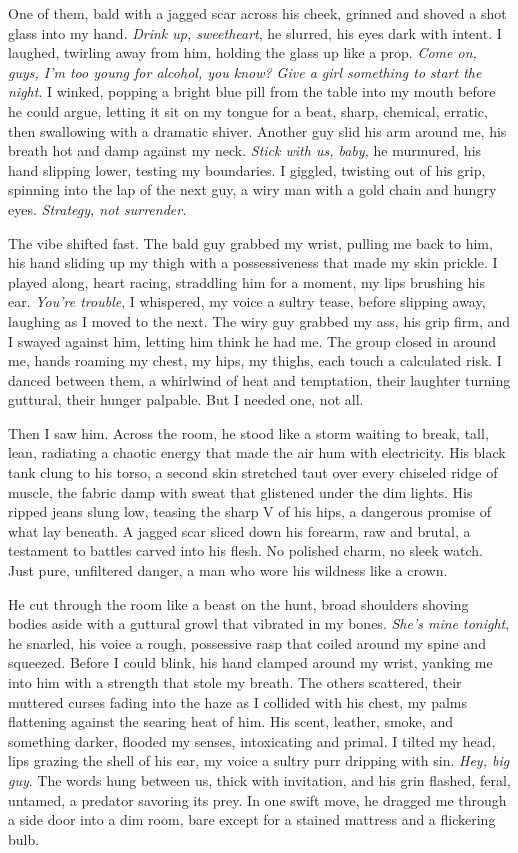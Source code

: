 \documentclass[12pt,oneside]{book} %
\begin{document}
One of them, bald with a jagged scar across his cheek, grinned and shoved a shot glass into my hand. \textit{Drink up, sweetheart}, he slurred, his eyes dark with intent. I laughed, twirling away from him, holding the glass up like a prop. \textit{Come on, guys, I’m too young for alcohol, you know? Give a girl something to start the night}. I winked, popping a bright blue pill from the table into my mouth before he could argue, letting it sit on my tongue for a beat, sharp, chemical, erratic, then swallowing with a dramatic shiver. Another guy slid his arm around me, his breath hot and damp against my neck. \textit{Stick with us, baby,} he murmured, his hand slipping lower, testing my boundaries. I giggled, twisting out of his grip, spinning into the lap of the next guy, a wiry man with a gold chain and hungry eyes. \textit{Strategy, not surrender.}

The vibe shifted fast. The bald guy grabbed my wrist, pulling me back to him, his hand sliding up my thigh with a possessiveness that made my skin prickle. I played along, heart racing, straddling him for a moment, my lips brushing his ear. \textit{You’re trouble}, I whispered, my voice a sultry tease, before slipping away, laughing as I moved to the next. The wiry guy grabbed my ass, his grip firm, and I swayed against him, letting him think he had me. The group closed in around me, hands roaming my chest, my hips, my thighs, each touch a calculated risk. I danced between them, a whirlwind of heat and temptation, their laughter turning guttural, their hunger palpable. But I needed one, not all.

Then I saw him. Across the room, he stood like a storm waiting to break, tall, lean, radiating a chaotic energy that made the air hum with electricity. His black tank clung to his torso, a second skin stretched taut over every chiseled ridge of muscle, the fabric damp with sweat that glistened under the dim lights. His ripped jeans slung low, teasing the sharp V of his hips, a dangerous promise of what lay beneath. A jagged scar sliced down his forearm, raw and brutal, a testament to battles carved into his flesh. No polished charm, no sleek watch. Just pure, unfiltered danger, a man who wore his wildness like a crown.

He cut through the room like a beast on the hunt, broad shoulders shoving bodies aside with a guttural growl that vibrated in my bones. \textit{She’s mine tonight}, he snarled, his voice a rough, possessive rasp that coiled around my spine and squeezed. Before I could blink, his hand clamped around my wrist, yanking me into him with a strength that stole my breath. The others scattered, their muttered curses fading into the haze as I collided with his chest, my palms flattening against the searing heat of him. His scent, leather, smoke, and something darker, flooded my senses, intoxicating and primal. I tilted my head, lips grazing the shell of his ear, my voice a sultry purr dripping with sin. \textit{Hey, big guy}. The words hung between us, thick with invitation, and his grin flashed, feral, untamed, a predator savoring its prey. In one swift move, he dragged me through a side door into a dim room, bare except for a stained mattress and a flickering bulb.
\end{document}
